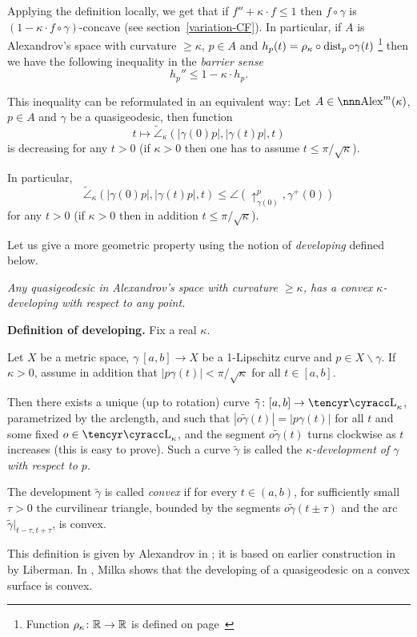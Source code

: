 \documentclass{article}
\begin{document}
Applying the definition locally, 
we get that if $f''+\kappa{\cdot}f\le 1$ then $f\circ\gamma$ is $(1-\kappa{\cdot}f\circ\gamma)$-concave (see section~\ref{variation-CF}). 
In particular, if $A$ is Alexandrov's space with curvature $\ge\kappa$, $p\in
A$ and $h_p(t)=\rho_\kappa\circ\operatorname{dist}_p\circ\gamma(t)$%
\footnote{Function
$\rho_\kappa\colon\mathbb{R}\to\mathbb{R}$ is defined on page~\pageref{rho_k}} 
then we have the
following inequality in the \emph{barrier sense}
$$h_p''\le 1- \kappa{\cdot} h_p.$$

This inequality can be reformulated in an equivalent way:
Let $A\in \Alex^m(\kappa)$, $p\in A$ and $\gamma$ be a quasigeodesic, then
function
$$t\mapsto \tilde\angle_\kappa(|\gamma(0)p|,|\gamma(t)p|,t)$$
is decreasing for any $t>0$ (if $\kappa>0$ then one has to assume
$t\le\pi/\sqrt\kappa$).

In particular, 
$$
\tilde\angle_\kappa(|\gamma(0)p|,|\gamma(t)p|,t)\le\angle(\uparrow_{\gamma(0)}^p,\gamma^+(0))$$ 
for any $t>0$ (if $\kappa>0$ then in addition $t\le\pi/\sqrt\kappa$).

Let us give a more geometric property using the notion of {\it developing} defined below. 

{\it Any quasigeodesic in Alexandrov's space with curvature $\ge \kappa$, has a
convex $\kappa$-developing with respect to any point.}


\begin{thm}{\bf Definition of developing.} 
Fix a real $\kappa$. 

Let $X$ be a metric space, $\gamma\:[a,b]\to X$ be a 1-Lipschitz curve and $p\in
X\backslash\gamma$. 
If $\kappa>0$, assume in addition that $|p\gamma(t)| < \pi/ \sqrt{\kappa}$ for
all 
$t\in [a,b]$. 

Then there exists a unique (up to rotation) curve
$\tilde\gamma\: [a,b]\to \Lob_\kappa$, parametrized by the arclength, and such
that
$|o\tilde\gamma(t)|=|p\gamma(t)|$ for all $t$ and some fixed $o\in \Lob_\kappa$,
and the segment
$o\tilde\gamma(t)$ turns clockwise as $t$ increases
(this is easy to prove).
Such a curve $\tilde\gamma$ is called the \emph{$\kappa$-development of $\gamma$
with respect to $p$}. 

The development $\tilde\gamma$ is called \emph{convex} if for every $t\in
(a,b)$, for sufficiently small $\tau > 0$ the
curvilinear triangle, bounded by the segments $o\tilde\gamma(t\pm\tau)$ and the
arc $\tilde\gamma|_{t-\tau,t+\tau}$, is convex. 
\end{thm}

This definition is given by Alexandrov in \cite{alexandrov:devel};
it is based on earlier construction in \cite{liberman} by Liberman.
In \cite{milka:qg}, Milka shows that the developing of a quasigeodesic on a convex surface is convex.
\end{document}
